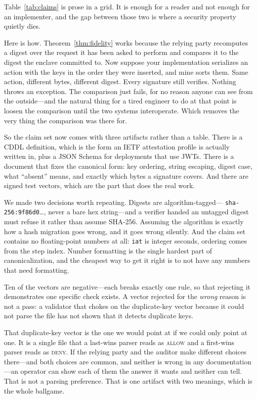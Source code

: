 \documentclass[11pt]{article}
\newcommand{\iat}{\texttt{iat}}
\begin{document}
Table~\ref{tab:claims} is prose in a grid. It is enough for a reader and not
enough for an implementer, and the gap between those two is where a security
property quietly dies.

Here is how. Theorem~\ref{thm:fidelity} works because the relying party
recomputes a digest over the request it has been asked to perform and compares
it to the digest the enclave committed to. Now suppose your implementation
serializes an action with the keys in the order they were inserted, and mine
sorts them. Same action, different bytes, different digest. Every signature
still verifies. Nothing throws an exception. The comparison just fails, for no
reason anyone can see from the outside---and the natural thing for a tired
engineer to do at that point is loosen the comparison until the two systems
interoperate. Which removes the very thing the comparison was there for.

So the claim set now comes with three artifacts rather than a table. There is a
CDDL definition, which is the form an IETF attestation profile is actually
written in, plus a JSON Schema for deployments that use JWTs. There is a
document that fixes the canonical form: key ordering, string escaping, digest
case, what ``absent'' means, and exactly which bytes a signature covers. And
there are signed test vectors, which are the part that does the real work.

We made two decisions worth repeating. Digests are algorithm-tagged---
\texttt{sha-256:9f86d0}\ldots, never a bare hex string---and a verifier handed
an untagged digest must refuse it rather than assume SHA-256. Assuming the
algorithm is exactly how a hash migration goes wrong, and it goes wrong
silently. And the claim set contains no floating-point numbers at all: \iat{}
is integer seconds, ordering comes from the step index. Number formatting is
the single hardest part of canonicalization, and the cheapest way to get it
right is to not have any numbers that need formatting.

Ten of the vectors are negative---each breaks exactly one rule, so that
rejecting it demonstrates one specific check exists. A vector rejected for the
\emph{wrong} reason is not a pass: a validator that chokes on the duplicate-key
vector because it could not parse the file has not shown that it detects
duplicate keys.

That duplicate-key vector is the one we would point at if we could only point
at one. It is a single file that a last-wins parser reads as \textsc{allow} and
a first-wins parser reads as \textsc{deny}. If the relying party and the
auditor make different choices there---and both choices are common, and neither
is wrong in any documentation---an operator can show each of them the answer it
wants and neither can tell. That is not a parsing preference. That is one
artifact with two meanings, which is the whole ballgame.
\end{document}
